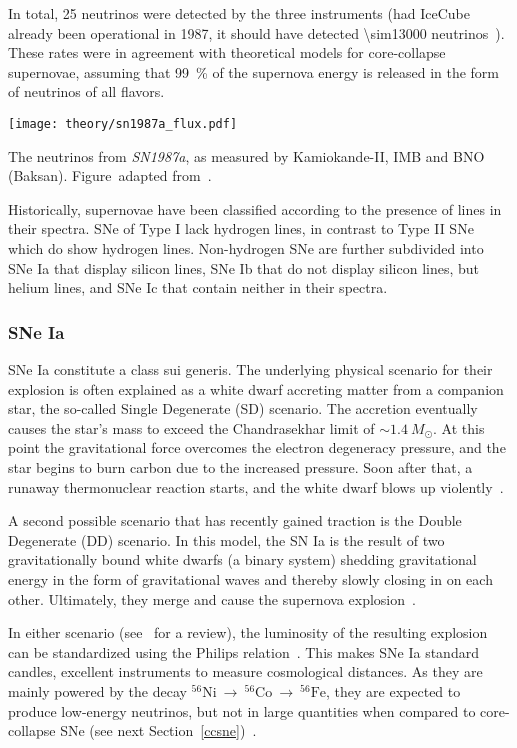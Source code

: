 In total, 25 neutrinos were detected by the three instruments (had IceCube already been operational in 1987, it should have detected \num{\sim13000} neutrinos~). These rates were in agreement with theoretical models for core-collapse supernovae, assuming that \SI{99}{\percent} of the supernova energy is released in the form of neutrinos of all flavors.

\begin{marginfigure}
  \texttt{[image: theory/sn1987a\_flux.pdf]}
  \caption[Neutrinos from \emph{SN1987a}]{The neutrinos from \emph{SN1987a}, as measured by Kamiokande-II, IMB and BNO (Baksan). Figure\ adapted from~\cite{Grupen2005}.}
\end{marginfigure}

Historically, supernovae have been classified according to the presence of lines in their spectra. SNe of Type I lack hydrogen lines, in contrast to Type II SNe which do show hydrogen lines. Non-hydrogen SNe are further subdivided into SNe Ia that display silicon lines, SNe Ib that do not display silicon lines, but helium lines, and SNe Ic that contain neither in their spectra.

\subsubsection{SNe Ia}\label{sne_ia}
SNe Ia constitute a class sui generis. The underlying physical scenario for their explosion is often explained as a white dwarf accreting matter from a companion star, the so-called Single Degenerate (SD) scenario. The accretion eventually causes the star's mass to exceed the Chandrasekhar limit of $\sim1.4~M_\odot$. At this point the gravitational force overcomes the electron degeneracy pressure, and the star begins to burn carbon due to the increased pressure. Soon after that, a runaway thermonuclear reaction starts, and the white dwarf blows up violently~.

A second possible scenario that has recently gained traction is the Double Degenerate (DD) scenario. In this model, the SN Ia is the result of two gravitationally bound white dwarfs (a binary system) shedding gravitational energy in the form of gravitational waves and thereby slowly closing in on each other. Ultimately, they merge and cause the supernova explosion~\cite{Iben1984}.

In either scenario (see~ for a review), the luminosity of the resulting explosion can be standardized using the Philips relation~. This makes SNe Ia standard candles, excellent instruments to measure cosmological distances. As they are mainly powered by the decay $^{56}\text{Ni}~\rightarrow~^{56}\text{Co}~\rightarrow~^{56}\text{Fe}$, they are expected to produce low-energy neutrinos, but not in large quantities when compared to core-collapse SNe (see next Section~\ref{ccsne})~.

